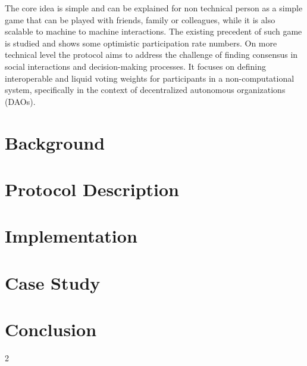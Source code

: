 \documentclass{article}
\begin{document}
\begin{multicols}{2}
The core idea is simple and can be explained for non technical person as a simple game that can be played with friends, family or colleagues, while it is also scalable to machine to machine interactions.  The existing precedent of such game is studied and shows some optimistic participation rate numbers.
On more technical level the protocol aims to address the challenge of finding consensus in social interactions and decision-making processes. It focuses on defining interoperable and liquid voting weights for participants in a non-computational system, specifically in the context of decentralized autonomous organizations (DAOs).\cite{lamport1994}

\section{Background}



\section{Protocol Description}
\section{Implementation}

\section{Case Study}

\section{Conclusion}

\end{multicols}{2}


\end{document}
